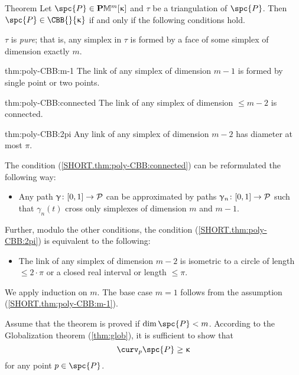 \begin{thm}{Theorem}\label{thm:poly-CBB} Let $\spc{P}\in\PM{m}\kappa$ and $\tau$ be a triangulation of $\spc{P}$.
Then $\spc{P}\in\CBB{}{\kappa}$ if and only if the following conditions hold.

\begin{subthm}{} $\tau$ is \emph{pure}; 
that is, any simplex in $\tau$ is formed by a face of some simplex of dimension exactly $m$. 
\end{subthm}

\begin{subthm}{thm:poly-CBB:m-1}
The link of any simplex of dimension $m-1$ is formed by single point or two points.
\end{subthm}

\begin{subthm}{thm:poly-CBB:connected}
The link of any simplex of dimension $\le m-2$ is connected.
\end{subthm}

\begin{subthm}{thm:poly-CBB:2pi}
Any link of any simplex of dimension $m-2$
has diameter at most $\pi$.
\end{subthm}
\end{thm}

The condition (\ref{SHORT.thm:poly-CBB:connected})
can be reformulated the following way:

\begin{itemize}
 \item[{\it \ref{SHORT.thm:poly-CBB:connected}$\,'\!$)}] 
Any path $\gamma\:[0,1]\to \spc{P}$ can be approximated by paths
$\gamma_n\:[0,1]\to \spc{P}$ 
such that $\gamma_n(t)$ cross only simplexes of dimension $m$ and $m-1$.
\end{itemize}

Further, modulo the other conditions,
the condition (\ref{SHORT.thm:poly-CBB:2pi})
is equivalent to the following:


\begin{itemize}
 \item[{\it \ref{SHORT.thm:poly-CBB:2pi}$\,'\!$)}] 
The link of any simplex of dimension $m-2$ is 
isometric to a circle of length $\le 2\cdot\pi$
or a closed real interval or length $\le \pi$.
\end{itemize}

 We apply induction on $m$.
The base case $m=1$ follows from the assumption (\ref{SHORT.thm:poly-CBB:m-1}).

Assume that the theorem is proved if $\dim\spc{P}<m$.
According to the Globalization theorem (\ref{thm:glob}),
it is sufficient to show that 
$$\curv_p\spc{P}\ge \kappa$$ 
for any point $p\in\spc{P}$. 

